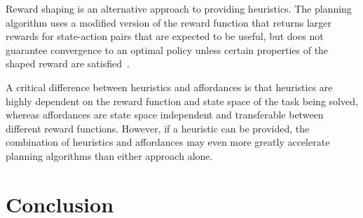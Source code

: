 \documentclass[letterpaper]{article}
\begin{document}
Reward shaping is an alternative approach to providing heuristics. The planning algorithm uses a modified version of the reward function that returns larger rewards for state-action pairs that are expected to be useful, but does not guarantee convergence to an optimal policy unless certain properties of the shaped reward are satisfied~\cite{potshap}.

A critical difference between heuristics and affordances is that heuristics are highly dependent on the reward function and state space of the task being solved, whereas affordances are state space independent and transferable between different reward functions. However, if a heuristic can be provided, the combination of heuristics and affordances may even more greatly accelerate planning algorithms than either approach alone.


\section{Conclusion}
\label{sec:conclusion}
\end{document}
